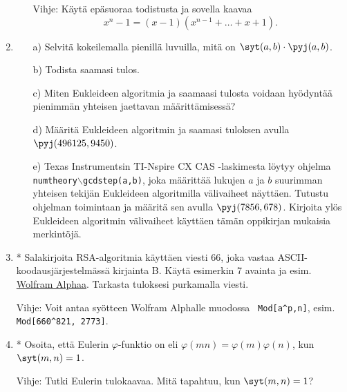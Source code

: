 \begin{enumerate}
\begin{itemize}
Vihje: Käytä epäsuoraa todistusta ja sovella kaavaa
\[
x^n-1 = (x-1)(x^{n-1}+\ldots+x+1).
\]
\end{itemize}

\item
\begin{itemize}
\item[a)] Selvitä kokeilemalla pienillä luvuilla, mitä on
$\syt(a,b)\cdot \pyj(a,b)$.
\item[b)] Todista saamasi tulos.
\item[c)] Miten Eukleideen algoritmia ja saamaasi tulosta voidaan
hyödyntää pienimmän yhteisen jaettavan määrittämisessä?
\item[d)] Määritä Eukleideen algoritmin ja saamasi tuloksen
avulla\\ $\pyj(496125,9450)$.
\item[e)] Texas Instrumentsin TI-Nspire CX CAS -laskimesta löytyy
ohjelma {\tt numtheory$\backslash$gcdstep(a,b)}, joka määrittää
lukujen $a$ ja $b$ suurimman yhteisen tekijän Eukleideen
algoritmilla välivaiheet näyttäen. Tutustu ohjelman toimintaan ja
määritä sen avulla $\pyj(7856,678)$. Kirjoita ylös Eukleideen
algoritmin välivaiheet käyttäen tämän oppikirjan mukaisia
merkintöjä.
\end{itemize}

\item * %
Salakirjoita RSA-algoritmia käyttäen
viesti $66$, joka vastaa ASCII-koodausjärjestelmässä kirjainta
B. Käytä esimerkin 7 avainta ja esim. \href{http://
www.wolframalpha.com}{Wolfram Alphaa}. Tarkasta tuloksesi
purkamalla viesti.

Vihje: Voit antaa syötteen Wolfram Alphalle muodossa {\tt
Mod[a\^{}p,n]}, esim. {\tt Mod[660\^{}821, 2773]}.

\item * %
Osoita, että Eulerin $\varphi$-funktio
on  eli $\varphi(mn) = \varphi(m)
\varphi(n)$, kun $\syt(m,n)=1$.

Vihje: Tutki Eulerin tulokaavaa. Mitä tapahtuu, kun $\syt(m,n)
=1$?

\end{enumerate}

